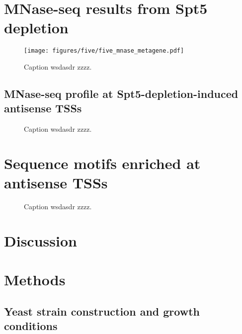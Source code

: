 \section{MNase-seq results from Spt5 depletion}

\begin{wrapfigure}[10]{r}{3in}
    \texttt{[image: figures/five/five\_mnase\_metagene.pdf]}
    \caption[Average MNase-seq dyad signal from Spt5 depleted and non-depleted cells, over non-overlapping coding genes.]{Caption wsdasdr zzzz.}
    \label{fig:five_mnase_metagene}
\end{wrapfigure}

\lipsum[1]

\subsection{MNase-seq profile at Spt5-depletion-induced antisense TSSs}

\begin{figure}
\caption[A figure showing MNase-seq signal around Spt5-depletion-induced antisense TSSs.]{Caption wsdasdr zzzz.}
\end{figure}

\section{Sequence motifs enriched at antisense TSSs}

\begin{figure}
\caption[A figure showing motifs enriched upstream of Spt5-depletion-induced antisense TSSs.]{Caption wsdasdr zzzz.}
\end{figure}

\section{Discussion}

\section{Methods}

\subsection{Yeast strain construction and growth conditions}

